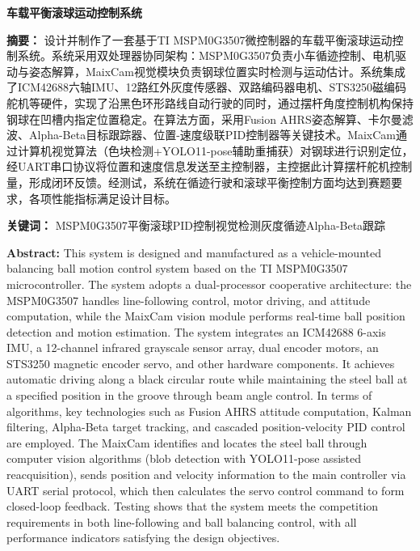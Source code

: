 \documentclass[12pt,a4paper]{ctexart}
\begin{document}
\begin{center}
    {\Large \bfseries 车载平衡滚球运动控制系统}
\end{center}

\vspace{1cm}

\noindent
\textbf{摘要：} 设计并制作了一套基于TI MSPM0G3507微控制器的车载平衡滚球运动控制系统。系统采用双处理器协同架构：MSPM0G3507负责小车循迹控制、电机驱动与姿态解算，MaixCam视觉模块负责钢球位置实时检测与运动估计。系统集成了ICM42688六轴IMU、12路红外灰度传感器、双路编码器电机、STS3250磁编码舵机等硬件，实现了沿黑色环形路线自动行驶的同时，通过摆杆角度控制机构保持钢球在凹槽内指定位置稳定。在算法方面，采用Fusion AHRS姿态解算、卡尔曼滤波、Alpha-Beta目标跟踪器、位置-速度级联PID控制器等关键技术。MaixCam通过计算机视觉算法（色块检测+YOLO11-pose辅助重捕获）对钢球进行识别定位，经UART串口协议将位置和速度信息发送至主控制器，主控据此计算摆杆舵机控制量，形成闭环反馈。经测试，系统在循迹行驶和滚球平衡控制方面均达到赛题要求，各项性能指标满足设计目标。

\noindent
\textbf{关键词：} MSPM0G3507\hspace{1.5em}平衡滚球\hspace{1.5em}PID控制\hspace{1.5em}视觉检测\hspace{1.5em}灰度循迹\hspace{1.5em}Alpha-Beta跟踪

\vspace{1cm}

\noindent
\textbf{Abstract:} This system is designed and manufactured as a vehicle-mounted balancing ball motion control system based on the TI MSPM0G3507 microcontroller. The system adopts a dual-processor cooperative architecture: the MSPM0G3507 handles line-following control, motor driving, and attitude computation, while the MaixCam vision module performs real-time ball position detection and motion estimation. The system integrates an ICM42688 6-axis IMU, a 12-channel infrared grayscale sensor array, dual encoder motors, an STS3250 magnetic encoder servo, and other hardware components. It achieves automatic driving along a black circular route while maintaining the steel ball at a specified position in the groove through beam angle control. In terms of algorithms, key technologies such as Fusion AHRS attitude computation, Kalman filtering, Alpha-Beta target tracking, and cascaded position-velocity PID control are employed. The MaixCam identifies and locates the steel ball through computer vision algorithms (blob detection with YOLO11-pose assisted reacquisition), sends position and velocity information to the main controller via UART serial protocol, which then calculates the servo control command to form closed-loop feedback. Testing shows that the system meets the competition requirements in both line-following and ball balancing control, with all performance indicators satisfying the design objectives.
\end{document}
